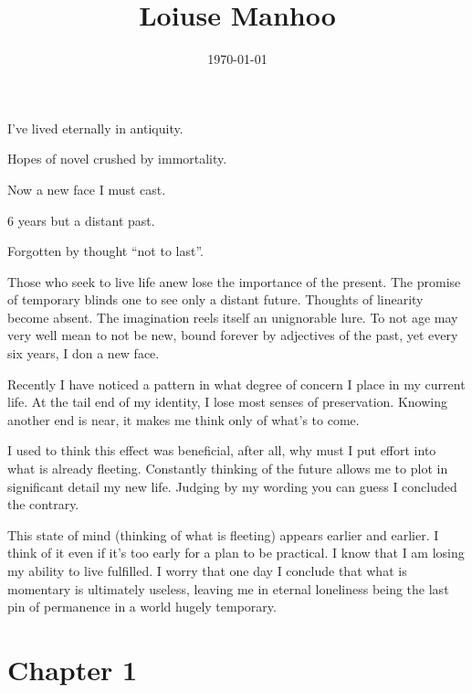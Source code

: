 \documentclass[11pt]{article}
\date{\today}
\title{Loiuse Manhoo}
\begin{document}
\thispagestyle{empty}
\clearpage
\thispagestyle{empty}
\clearpage

\setcounter{tocdepth}{2}
\tableofcontents
\pagebreak
\begin{center}
I've lived eternally in antiquity.

Hopes of novel crushed by immortality.

Now a new face I must cast.

6 years but a distant past.

Forgotten by thought ``not to last''.
\end{center}

Those who seek to live life anew lose the importance of the present. The promise of temporary blinds one to see only a distant future. Thoughts of linearity become absent. The imagination reels itself an unignorable lure. To not age may very well mean to not be new, bound forever by adjectives of the past, yet every six years, I don a new face.

Recently I have noticed a pattern in what degree of concern I place in my current life. At the tail end of my identity, I lose most senses of preservation. Knowing another end is near, it makes me think only of what's to come.

I used to think this effect was beneficial, after all, why must I put effort into what is already fleeting. Constantly thinking of the future allows me to plot in significant detail my new life. Judging by my wording you can guess I concluded the contrary.

This state of mind (thinking of what is fleeting) appears earlier and earlier. I think of it even if it's too early for a plan to be practical. I know that I am losing my ability to live fulfilled. I worry that one day I conclude that what is momentary is ultimately useless, leaving me in eternal loneliness being the last pin of permanence in a world hugely temporary.

\section{Chapter 1}
\label{sec:org1736eda}
\end{document}
